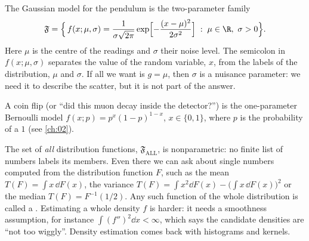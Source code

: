 The Gaussian model for the pendulum is the two-parameter family
\begin{equation}
  \mathfrak F=\Bigl\{\,f(x;\mu,\sigma)=\frac{1}{\sigma\sqrt{2\pi}}
  \exp\Bigl[-\frac{(x-\mu)^2}{2\sigma^2}\Bigr]\;:\;\mu\in\R,\ \sigma>0\Bigr\}.
  \label{3a:eq:gauss-model}
\end{equation}
Here $\mu$ is the centre of the readings and $\sigma$ their noise level. The
semicolon in $f(x;\mu,\sigma)$ separates the value of the random variable,
$x$, from the labels of the distribution, $\mu$ and $\sigma$. If all we want
is $g=\mu$, then $\sigma$ is a nuisance parameter: we need it to describe the
scatter, but it is not part of the answer.

A coin flip (or ``did this muon decay inside the detector?'') is the
one-parameter Bernoulli model $f(x;p)=p^x(1-p)^{1-x}$, $x\in\{0,1\}$, where
$p$ is the probability of a $1$ (see \cref{ch:02}).

The set of \emph{all} distribution functions, $\mathfrak F_{\mathrm{ALL}}$, is
nonparametric: no finite list of numbers labels its members. Even there we
can ask about single numbers computed from the distribution function $F$,
such as the mean $T(F)=\int x\,\dd F(x)$, the variance
$T(F)=\int x^2\dd F(x)-\bigl(\int x\,\dd F(x)\bigr)^2$ or the median
$T(F)=F^{-1}(1/2)$. Any such function of the whole distribution is called a
 . Estimating a whole density
$f$ is harder: it needs a smoothness assumption, for instance
$\int(f'')^2\dd x<\infty$, which says the candidate densities are ``not too
wiggly''. Density estimation comes back with histograms and kernels.

